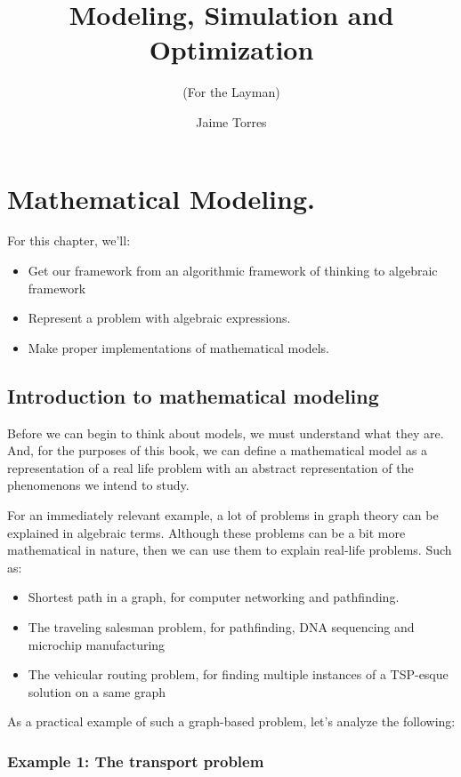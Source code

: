 \documentclass{textbook}
\title     {Modeling, Simulation and Optimization}
\subtitle  {(For the Layman)}
\author    {Jaime Torres}
\begin{document}
\tableofcontents

\chapter{Mathematical Modeling.}

For this chapter, we'll:

\begin{itemize}
    \item Get our framework from an algorithmic framework of thinking to algebraic 
    framework
    \item Represent a problem with algebraic expressions.
    \item Make proper implementations of mathematical models.
\end{itemize}

\section{Introduction to mathematical modeling}

Before we can begin to think about models, we must understand what they are.
And, for the purposes of this book, we can define a mathematical model as a representation
of a real life problem with an abstract representation of the phenomenons we intend to study.

For an immediately relevant example, a lot of problems in graph theory can be explained in algebraic terms.
Although these problems can be a bit more mathematical in nature, then we can use them to explain real-life problems.
Such as:

\begin{itemize}
    \item Shortest path in a graph, for computer networking and pathfinding.
    \item The traveling salesman problem, for pathfinding, DNA sequencing and microchip manufacturing 
    \item The vehicular routing problem, for finding multiple instances of a TSP-esque solution on a same graph
\end{itemize}

As a practical example of such a graph-based problem, let's analyze the following:

\subsection{Example 1: The transport problem}
\end{document}
